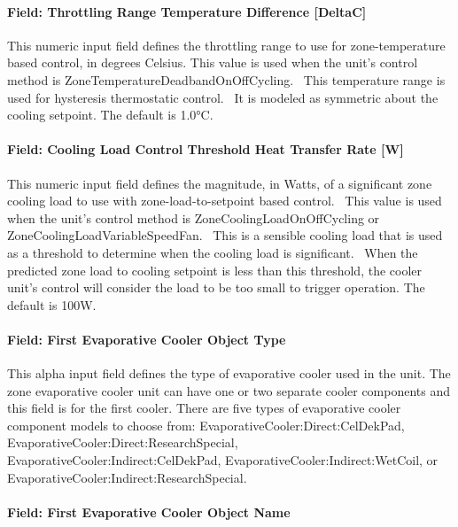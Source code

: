 \paragraph{Field: Throttling Range Temperature Difference {[}DeltaC{]}}\label{field-throttling-range-temperature-difference-deltac}

This numeric input field defines the throttling range to use for zone-temperature based control, in degrees Celsius. This value is used when the unit's control method is ZoneTemperatureDeadbandOnOffCycling.~ This temperature range is used for hysteresis thermostatic control.~ It is modeled as symmetric about the cooling setpoint. The default is 1.0°C.

\paragraph{Field: Cooling Load Control Threshold Heat Transfer Rate {[}W{]}}\label{field-cooling-load-control-threshold-heat-transfer-rate-w}

This numeric input field defines the magnitude, in Watts, of a significant zone cooling load to use with zone-load-to-setpoint based control.~ This value is used when the unit's control method is ZoneCoolingLoadOnOffCycling or ZoneCoolingLoadVariableSpeedFan.~ This is a sensible cooling load that is used as a threshold to determine when the cooling load is significant.~ When the predicted zone load to cooling setpoint is less than this threshold, the cooler unit's control will consider the load to be too small to trigger operation. The default is 100W.

\paragraph{Field: First Evaporative Cooler Object Type}\label{field-first-evaporative-cooler-object-type}

This alpha input field defines the type of evaporative cooler used in the unit. The zone evaporative cooler unit can have one or two separate cooler components and this field is for the first cooler. There are five types of evaporative cooler component models to choose from: EvaporativeCooler:Direct:CelDekPad, EvaporativeCooler:Direct:ResearchSpecial, EvaporativeCooler:Indirect:CelDekPad, EvaporativeCooler:Indirect:WetCoil, or EvaporativeCooler:Indirect:ResearchSpecial.

\paragraph{Field: First Evaporative Cooler Object Name}\label{field-first-evaporative-cooler-object-name}

